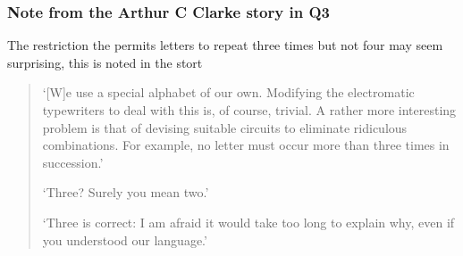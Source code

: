 \documentclass[11pt,a4paper]{scrartcl}
\begin{document}
\subsubsection*{Note from the Arthur C Clarke story in Q3}

The restriction the permits letters to repeat three times but not four may seem surprising, this is noted in the stort
\begin{quotation}
\lq{}[W]e use a special alphabet of our own. Modifying the electromatic typewriters to deal with this is, of course, trivial. A rather more interesting problem is that of devising suitable circuits to eliminate ridiculous combinations. For example, no letter must occur more than three times in succession.\rq{}

\lq{}Three? Surely you mean two.\rq{}

\lq{}Three is correct: I am afraid it would take too long to explain why, even if you understood our language.\rq{}
\end{quotation}
\end{document}
